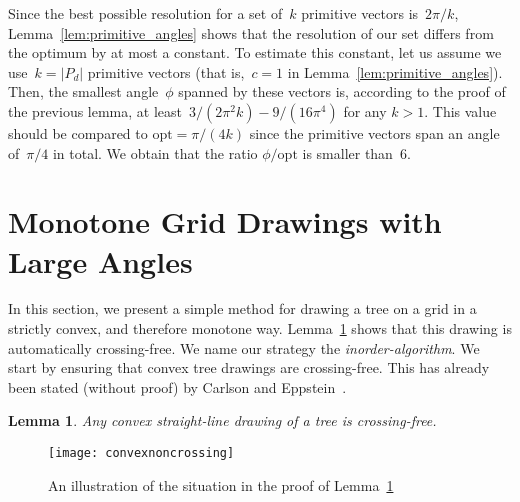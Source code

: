 \documentclass[a4paper,11pt]{article}
\theoremstyle{plain}
\newtheorem{lemma}{Lemma}
\begin{document}
Since the best possible resolution for a set of~$k$ primitive vectors 
is~$2\pi/k$, Lemma~\ref{lem:primitive_angles} shows that the
resolution of our set differs from the optimum by at most a constant.
To estimate this constant, let us assume we use~$k=|P_d|$ primitive vectors
(that is,~$c=1$ in Lemma~\ref{lem:primitive_angles}). Then, the smallest 
angle~$\phi$ spanned by these vectors is, according to the proof of the previous 
lemma, at least~$3/(2 \pi^2 k) - 9/(16 \pi^4)$ for any $k>1$. This value should
be compared to $\text{opt}=\pi/(4k)$ since the primitive vectors span an angle 
of~$\pi/4$ in total. We obtain that the ratio $\phi /\text{opt}$ is smaller than~6. 

\section{Monotone Grid Drawings with Large Angles}
\label{sec:griddrawing}

In this section, we present a simple method for drawing a
tree on a grid in a strictly convex, and therefore monotone way.
Lemma~\ref{lem:crossing-free} shows that this drawing is automatically
crossing-free. We name our strategy the \emph{inorder-algorithm}.
We start by ensuring that convex tree drawings are crossing-free.
This has already been stated (without proof) by Carlson and
Eppstein~\cite{ce-tcfoa-GD06}.
\begin{lemma} 
  \label{lem:crossing-free}
  Any convex straight-line drawing of a tree is crossing-free.
\end{lemma}

  \begin{figure}[t]
    \centering
    \texttt{[image: convexnoncrossing]}
    \caption{An illustration of the situation in the proof of
      Lemma~\ref{lem:crossing-free}} 
    \label{fig:crossingfree}
  \end{figure}
\end{document}
